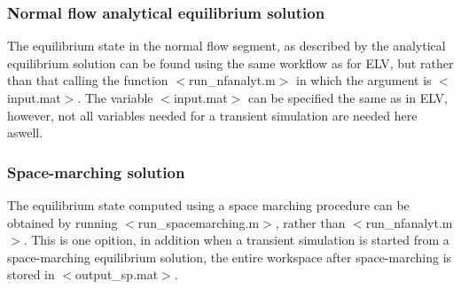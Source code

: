 \documentclass[a4paper, 11pt]{article}
\newcommand{\pathfile}[1]{$<$#1$>$}
\begin{document}
\subsubsection{Normal flow analytical equilibrium solution}
The equilibrium state in the normal flow segment, as described by the analytical equilibrium solution can be found using the same workflow as for ELV, but rather than that calling the function \pathfile{run\_nfanalyt.m} in which the argument is \pathfile{input.mat}. The variable \pathfile{input.mat} can be specified the same as in ELV, however, not all variables needed for a transient simulation are needed here aswell.

\subsubsection{Space-marching solution}
The equilibrium state computed using a space marching procedure can be obtained by running \pathfile{run\_spacemarching.m}, rather than \pathfile{run\_nfanalyt.m}. This is one opition, in addition when a transient simulation is started from a space-marching equilibrium solution, the entire workspace after space-marching is stored in  \pathfile{output\_sp.mat}.
\end{document}
